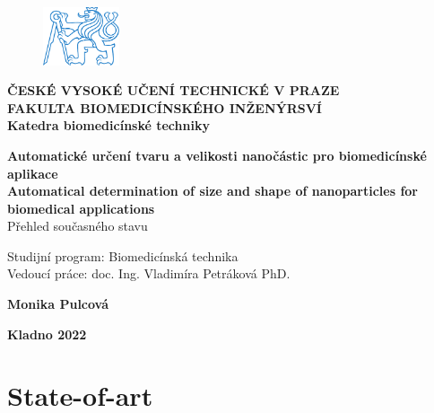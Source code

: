 \documentclass[a4paper,12pt]{article}   %
\numberwithin{equation}{section}        %
\newcommand{\autor}{Monika Pulcová}
\newcommand{\vedouci}{doc. Ing. Vladimíra Petráková PhD.}
\newcommand{\nazevENG}{Automatical determination of size and shape of nanoparticles for biomedical applications}
\newcommand{\nazev}{Automatické určení tvaru a velikosti nanočástic pro biomedicínské aplikace}
\newcommand{\typ}{Přehled současného stavu}
\newcommand{\rok}{2022}
\newcommand{\program}{Biomedicínská technika}
\begin{document}
	\begin{titlepage}
 		\begin{center}
 		\begin{figure}[!h]
			\centering
 			\includegraphics[width=0.2\textwidth]{symbol_cvut_konturova_verze}
 		\end{figure}
 		\textsf{\large{\textbf{ČESKÉ VYSOKÉ UČENÍ TECHNICKÉ V PRAZE}}}\\
         {\color{NavyBlue}\makebox[\linewidth]{\rule{\textwidth}{0.4mm}}}
 		\textsf{\normalsize{\textbf{FAKULTA BIOMEDICÍNSKÉHO INŽENÝRSVÍ}}}\\
		\textsf{\textbf{Katedra biomedicínské techniky}}\\	
		
		\vfill
 		
		\textsf{\Large{\textbf{\nazev}}}\\
	    \vspace{24pt}
		\textsf{\Large{\textbf{\nazevENG}}}\\
		\vspace{24pt}
		\textsf{\typ}\\ 
		\vfill
		\end{center}
		\textsf{Studijní program: \program}\\
		\textsf{Vedoucí práce: \vedouci}\\
				
		\begin{center}
		\textsf{\textbf{\autor}} \\ [0.5cm] 
		
		{\color{NavyBlue}\makebox[\linewidth]{\rule{\textwidth}{0.4mm}}} 
 		
		\textsf{\textbf{Kladno \rok}}
		\end{center}
			

		\clearpage


	\end{titlepage}

    \section{State-of-art}
\end{document}
